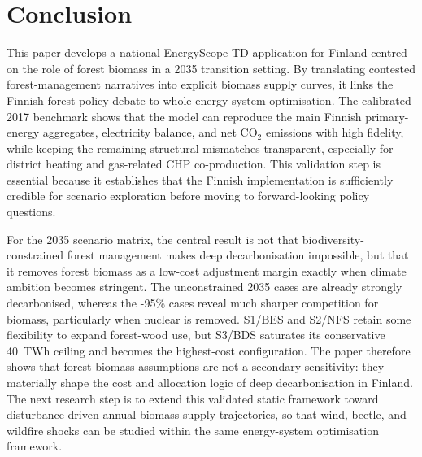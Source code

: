 \documentclass{article}
\begin{document}
\section{Conclusion}
\label{sec:conclusion}

This paper develops a national EnergyScope TD application for Finland centred on the role of forest biomass in a 2035 transition setting. By translating contested forest-management narratives into explicit biomass supply curves, it links the Finnish forest-policy debate to whole-energy-system optimisation. The calibrated 2017 benchmark shows that the model can reproduce the main Finnish primary-energy aggregates, electricity balance, and net CO$_2$ emissions with high fidelity, while keeping the remaining structural mismatches transparent, especially for district heating and gas-related CHP co-production. This validation step is essential because it establishes that the Finnish implementation is sufficiently credible for scenario exploration before moving to forward-looking policy questions.

For the 2035 scenario matrix, the central result is not that biodiversity-constrained forest management makes deep decarbonisation impossible, but that it removes forest biomass as a low-cost adjustment margin exactly when climate ambition becomes stringent. The unconstrained 2035 cases are already strongly decarbonised, whereas the -95\% cases reveal much sharper competition for biomass, particularly when nuclear is removed. S1/BES and S2/NFS retain some flexibility to expand forest-wood use, but S3/BDS saturates its conservative 40~TWh ceiling and becomes the highest-cost configuration. The paper therefore shows that forest-biomass assumptions are not a secondary sensitivity: they materially shape the cost and allocation logic of deep decarbonisation in Finland. The next research step is to extend this validated static framework toward disturbance-driven annual biomass supply trajectories, so that wind, beetle, and wildfire shocks can be studied within the same energy-system optimisation framework.







\end{document}
